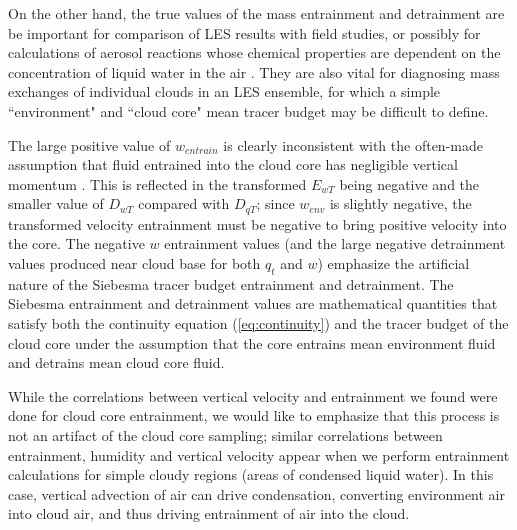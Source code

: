 \documentclass[12pt]{article}
\begin{document}
On the other hand, the true values of the mass entrainment and detrainment are
be important for comparison of LES results with field studies, or possibly for
calculations of aerosol reactions whose chemical properties are dependent on the
concentration of liquid water in the air \citep{Hoppel1994}.  They are also 
vital for diagnosing mass exchanges of individual clouds in an LES ensemble, 
for which a simple ``environment" and ``cloud core" mean tracer budget may be
difficult to define.

The large positive value of $w_{entrain}$ is clearly inconsistent with the
often-made assumption that fluid entrained into the cloud core has negligible
vertical momentum \citep{Simpson1969,Gregory2001,Siebesma2003}.  This is
reflected in the transformed $E_{wT}$ being negative and the smaller value of 
$D_{wT}$ compared with $D_{qT}$; since $w_{env}$ is slightly negative, the
transformed velocity entrainment must be negative to bring positive velocity 
into the core.  The negative $w$ entrainment values (and the large negative
detrainment values produced near cloud base for both $q_t$ and $w$) emphasize 
the artificial nature of the Siebesma tracer budget entrainment and 
detrainment.  The Siebesma entrainment and detrainment values are mathematical
quantities that satisfy both the continuity equation (\ref{eq:continuity}) and
the tracer budget of the cloud core under the assumption that the core entrains
mean environment fluid and detrains mean cloud core fluid.

While the correlations between vertical velocity and entrainment we found were done for cloud core entrainment, we would like to emphasize that this process 
is not an artifact of the cloud core sampling; similar correlations between
entrainment, humidity and vertical velocity appear when we perform entrainment
calculations for simple cloudy regions (areas of condensed liquid water).  In
this case, vertical advection of air can drive condensation, converting
environment air into cloud air, and thus driving entrainment of air into the
cloud.
\end{document}
